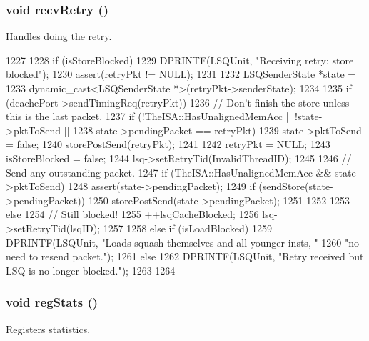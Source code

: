 \hypertarget{classLSQUnit_a29cb5a4f98063ce6e9210eacbdb35298}{
\subsubsection[{recvRetry}]{\setlength{\rightskip}{0pt plus 5cm}void recvRetry ()}}
\label{classLSQUnit_a29cb5a4f98063ce6e9210eacbdb35298}
Handles doing the retry. 


\begin{DoxyCode}
1227 {
1228     if (isStoreBlocked) {
1229         DPRINTF(LSQUnit, "Receiving retry: store blocked\n");
1230         assert(retryPkt != NULL);
1231 
1232         LSQSenderState *state =
1233             dynamic_cast<LSQSenderState *>(retryPkt->senderState);
1234 
1235         if (dcachePort->sendTimingReq(retryPkt)) {
1236             // Don't finish the store unless this is the last packet.
1237             if (!TheISA::HasUnalignedMemAcc || !state->pktToSend ||
1238                     state->pendingPacket == retryPkt) {
1239                 state->pktToSend = false;
1240                 storePostSend(retryPkt);
1241             }
1242             retryPkt = NULL;
1243             isStoreBlocked = false;
1244             lsq->setRetryTid(InvalidThreadID);
1245 
1246             // Send any outstanding packet.
1247             if (TheISA::HasUnalignedMemAcc && state->pktToSend) {
1248                 assert(state->pendingPacket);
1249                 if (sendStore(state->pendingPacket)) {
1250                     storePostSend(state->pendingPacket);
1251                 }
1252             }
1253         } else {
1254             // Still blocked!
1255             ++lsqCacheBlocked;
1256             lsq->setRetryTid(lsqID);
1257         }
1258     } else if (isLoadBlocked) {
1259         DPRINTF(LSQUnit, "Loads squash themselves and all younger insts, "
1260                 "no need to resend packet.\n");
1261     } else {
1262         DPRINTF(LSQUnit, "Retry received but LSQ is no longer blocked.\n");
1263     }
1264 }
\end{DoxyCode}
\hypertarget{classLSQUnit_a4dc637449366fcdfc4e764cdf12d9b11}{
\subsubsection[{regStats}]{\setlength{\rightskip}{0pt plus 5cm}void regStats ()}}
\label{classLSQUnit_a4dc637449366fcdfc4e764cdf12d9b11}
Registers statistics. 


